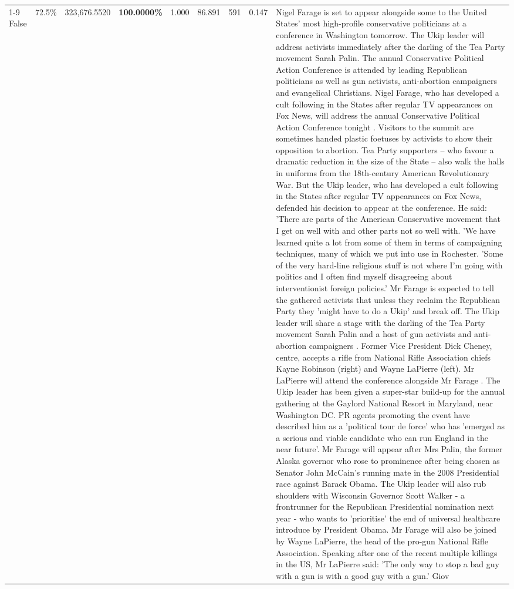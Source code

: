 \begin{table}[H]
\begin{tabular}{lllrlllll}
\cline{1-9} \cline{2-9}
False & 72.5\% & 323,676.5520 & \bfseries \color{red} 100.0000\% & 1.000 & 86.891 & 591 & 0.147 & Nigel Farage is set to appear alongside some to the United States' most high-profile conservative politicians at a conference in Washington tomorrow. The Ukip leader will address activists immediately after the darling of the Tea Party movement Sarah Palin. The annual Conservative Political Action Conference is attended by leading Republican politicians as well as gun activists, anti-abortion campaigners and evangelical Christians. Nigel Farage, who has developed a cult following in the States after regular TV appearances on Fox News, will address the annual Conservative Political Action Conference tonight . Visitors to the summit are sometimes handed plastic foetuses by activists to show their opposition to abortion. Tea Party supporters – who favour a dramatic reduction in the size of the State – also walk the halls in uniforms from the 18th-century American Revolutionary War. But the Ukip leader, who has developed a cult following in the States after regular TV appearances on Fox News, defended his decision to appear at the conference. He said: 'There are parts of the American Conservative movement that I get on well with and other parts not so well with. 'We have learned quite a lot from some of them in terms of campaigning techniques, many of which we put into use in Rochester. 'Some of the very hard-line religious stuff is not where I'm going with politics and I often find myself disagreeing about interventionist foreign policies.' Mr Farage is expected to tell the gathered activists that unless they reclaim the Republican Party they 'might have to do a Ukip' and break off. The Ukip leader will share a stage with the darling of the Tea Party movement Sarah Palin and a host of gun activists and anti-abortion campaigners . Former Vice President Dick Cheney, centre, accepts a rifle from National Rifle Association chiefs Kayne Robinson (right) and Wayne LaPierre (left). Mr LaPierre will attend the conference alongside Mr Farage . The Ukip leader has been given a super-star build-up for the annual gathering at the Gaylord National Resort in Maryland, near Washington DC. PR agents promoting the event have described him as a 'political tour de force' who has 'emerged as a serious and viable candidate who can run England in the near future'. Mr Farage will appear after Mrs Palin, the former Alaska governor who rose to prominence after being chosen as Senator John McCain's running mate in the 2008 Presidential race against Barack Obama. The Ukip leader will also rub shoulders with Wisconsin Governor Scott Walker - a frontrunner for the Republican Presidential nomination next year - who wants to 'prioritise' the end of universal healthcare introduce by President Obama. Mr Farage will also be joined by Wayne LaPierre, the head of the pro-gun National Rifle Association. Speaking after one of the recent multiple killings in the US, Mr LaPierre said: 'The only way to stop a bad guy with a gun is with a good guy with a gun.' Giov \\

\end{tabular}
\end{table}
